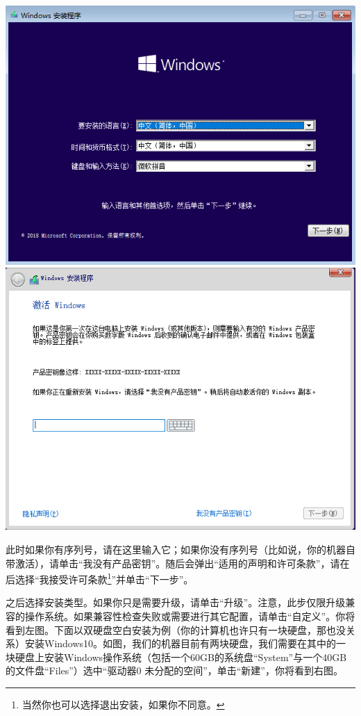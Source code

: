 \begin{center}
	\includegraphics[scale=0.45]{pic/win10setup2}	\includegraphics[scale=0.45]{pic/win10setup3}
\end{center} \par
此时如果你有序列号，请在这里输入它；如果你没有序列号（比如说，你的机器自带激活），请单击“我没有产品密钥”。随后会弹出“适用的声明和许可条款”，请在{\color{red}{仔细阅读}}后选择“我接受许可条款\footnote{当然你也可以选择退出安装，如果你不同意。}”并单击“下一步”。\par
之后选择安装类型。如果你只是需要升级，请单击“升级”。注意，此步仅限升级兼容的操作系统。如果兼容性检查失败或需要进行其它配置，请单击“自定义”。你将看到左图。下面以双硬盘空白安装为例（你的计算机也许只有一块硬盘，那也没关系）安装Windows10。如图，我们的机器目前有两块硬盘，我们需要在其中的一块硬盘上安装Windows操作系统（包括一个60GB的系统盘“System”与一个40GB的文件盘“Files”）选中“驱动器0 未分配的空间”，单击“新建”，你将看到右图。

